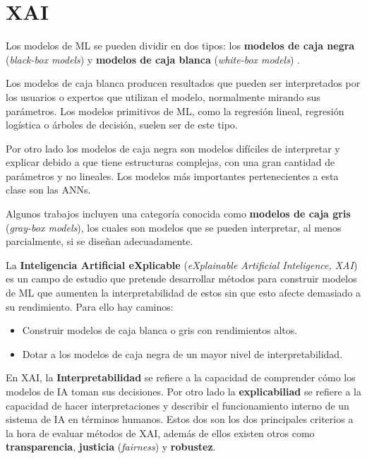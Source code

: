 \section{XAI}

Los modelos de ML se pueden dividir en dos tipos: los \textbf{modelos de caja negra} (\textit{black-box models}) y \textbf{modelos de caja blanca} (\textit{white-box models}) \cite{XAIWHATWEKNOW, XAINOTIONS}.

 Los modelos de caja blanca producen resultados que pueden ser interpretados por los usuarios o expertos que utilizan el modelo, normalmente mirando sus parámetros. Los modelos primitivos de ML, como la regresión lineal, regresión logística o árboles de decisión, suelen ser de este tipo. 
 
Por otro lado los modelos de caja negra son modelos difíciles de interpretar y explicar debido a que tiene estructuras complejas, con una gran cantidad de parámetros y no lineales. Los modelos más importantes pertenecientes a esta clase son las ANNs. 

Algunos trabajos incluyen una categoría conocida como \textbf{modelos de caja gris} (\textit{gray-box models}), los cuales son modelos que se pueden interpretar, al menos parcialmente, si se diseñan adecuadamente.


La \textbf{Inteligencia Artificial eXplicable} (\textit{eXplainable Artificial Inteligence, XAI}) \cite{XAIManifesto, XAIWHATWEKNOW, XAINOTIONS, XAICONCEPTS} es un campo de estudio que pretende desarrollar métodos para construir modelos de ML que aumenten la interpretabilidad de estos sin que esto afecte demasiado a su rendimiento. Para ello hay caminos:

\begin{itemize}
\item Construir modelos de caja blanca o gris con rendimientos altos.
\item Dotar a los modelos de caja negra de un mayor nivel de interpretabilidad.
\end{itemize}

En XAI, la \textbf{Interpretabilidad} se refiere a la capacidad de comprender cómo los modelos de IA toman sus decisiones. Por otro lado la \textbf{explicabiliad} se refiere a la capacidad de hacer interpretaciones y describir el funcionamiento interno de un sistema de IA en términos humanos. Estos dos son los dos principales criterios a la hora de evaluar métodos de XAI, además de ellos existen otros como \textbf{transparencia}, \textbf{justicia} (\textit{fairness}) y \textbf{robustez}. 

